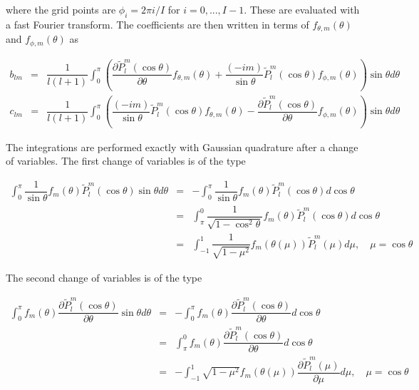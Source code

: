\noindent where the grid points are $\phi_i = 2\pi i/I$ for $i = 0,...,I-1$.  These are evaluated with a fast Fourier transform.  The coefficients are then written in terms of $f_{\theta,m}(\theta)$ and $f_{\phi,m}(\theta)$ as

\begin{eqnarray}
b_{lm} &=& \dfrac{1}{l(l+1)}\int_0^{\pi} \left( \dfrac{\partial \widetilde{P}_l^m(\cos\theta)}{\partial\theta}f_{\theta,m}(\theta)   + \dfrac{(-im)}{\sin\theta} \widetilde{P}_l^m(\cos\theta) f_{\phi,m}(\theta)  \right) \sin\theta d\theta   \label{blmftheta}
\end{eqnarray}
\begin{eqnarray}
c_{lm} &=& \dfrac{1}{l(l+1)}\int_0^{\pi} \left(\dfrac{(-im)}{\sin\theta} \widetilde{P}_l^m(\cos\theta) f_{\theta,m}(\theta)   -  \dfrac{\partial \widetilde{P}_l^m(\cos\theta)}{\partial\theta}f_{\phi,m}(\theta)  \right) \sin\theta d\theta \label{clmftheta}
\end{eqnarray}

The integrations are performed exactly with Gaussian quadrature after a change of variables.  The first change of variables is of the type

\begin{eqnarray}
\int_{0}^{\pi} \dfrac{1}{\sin\theta}f_m(\theta) \widetilde{P}_l^m(\cos \theta) \sin \theta d \theta & = & -\int_{0}^{\pi} \dfrac{1}{\sin\theta} f_m(\theta) \widetilde{P}_l^m(\cos \theta) d\cos\theta \\
\ &= & \int_{\pi}^{0} \dfrac{1}{\sqrt{1-\cos^2\theta}}f_m(\theta) \widetilde{P}_l^m(\cos \theta) d\cos\theta \\
\ & = & \int_{-1}^{1} \dfrac{1}{\sqrt{1-\mu^2}}f_m(\theta( \mu)) \widetilde{P}_l^m(\mu) d\mu, \quad \mu = \cos\theta 
\end{eqnarray}

The second change of variables is of the type

\begin{eqnarray}
 \int_{0}^{\pi} f_m(\theta) \dfrac{\partial \widetilde{P}_l^m(\cos\theta)}{\partial\theta} \sin \theta d \theta & = & -\int_{0}^{\pi} f_m(\theta) \dfrac{\partial \widetilde{P}_l^m(\cos\theta)}{\partial\theta} d\cos\theta \\
\ &= & \int_{\pi}^{0} f_m(\theta) \dfrac{\partial \widetilde{P}_l^m(\cos\theta)}{\partial\theta} d\cos\theta \\
\ &= & -\int_{-1}^{1} \sqrt{1-\mu^2}f_m(\theta(\mu)) \dfrac{\partial \widetilde{P}_l^m(\mu)}{\partial\mu}d\mu, \quad \mu = \cos\theta 
\end{eqnarray}


